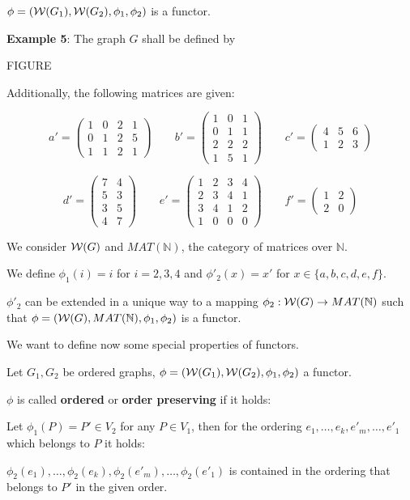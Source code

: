 $\phi = (\mbox{$\mathcal{W}(G_1)$}, \mbox{$\mathcal{W}(G_2)$}, \phi_1, \phi_2)$ is a functor.

{\bf Example 5}: The graph $G$ shall be defined by

FIGURE

Additionally, the following matrices are given:

\[
a' = \left( \begin{array}{cccc}
1 & 0 & 2 & 1 \\ 0 & 1 & 2 & 5 \\ 1 & 1 & 2 & 1
\end{array} \right)
\qquad 
b' = \left( \begin{array}{ccc}
1 & 0 & 1 \\ 0 & 1 & 1 \\ 2 & 2 & 2 \\ 1 & 5 & 1
\end{array} \right)
\qquad 
c' = \left( \begin{array}{ccc}
4 & 5 & 6 \\ 1 & 2 & 3
\end{array} \right)
\]

\[
d' = \left( \begin{array}{cc}
7 & 4 \\ 5 & 3 \\ 3 & 5 \\ 4 & 7
\end{array} \right)
\qquad
e' = \left( \begin{array}{cccc}
1&2&3&4 \\ 2&3&4&1 \\ 3&4&1&2 \\ 1&0&0&0
\end{array} \right)
\qquad
f' = \left( \begin{array}{cc}
1&2 \\ 2&0
\end{array} \right)
\]

We consider $\mbox{$\mathcal{W}(G)$}$ and $MAT(\mathbb{N})$, the category of matrices
over $\mathbb{N}$.

We define $\phi_1(i) = i$ for $i = 2,3,4$ and $\phi'_2(x) = x'$ for $x \in \{
a, b, c, d, e, f \}$.

$\phi'_2$ can be extended in a unique way to a mapping $\phi_2 :
\mbox{$\mathcal{W}(G)$} \to MAT(\mathbb{N})$ such that $\phi = (\mbox{$\mathcal{W}(G)$},
MAT(\mathbb{N}), \phi_1, \phi_2)$ is a functor.

We want to define now some special properties of functors.

\begin{definition}
Let $G_1, G_2$ be ordered graphs, $\phi = (\mbox{$\mathcal{W}(G_1)$}, \mbox{$\mathcal{W}(G_2)$},
\phi_1, \phi_2)$ a functor.

$\phi$ is called {\bf ordered} or {\bf order preserving} if it holds:

Let $\phi_1(P) = P' \in V_2$ for any $P \in V_1$, then for the ordering $e_1,
\ldots, e_k, e'_m, \ldots, e'_1$ which belongs to $P$ it holds:

$\phi_2(e_1), \ldots, \phi_2(e_k), \phi_2(e'_m), \ldots, \phi_2(e'_1)$ is
contained in the ordering that belongs to $P'$ in the given order. 
\end{definition}

